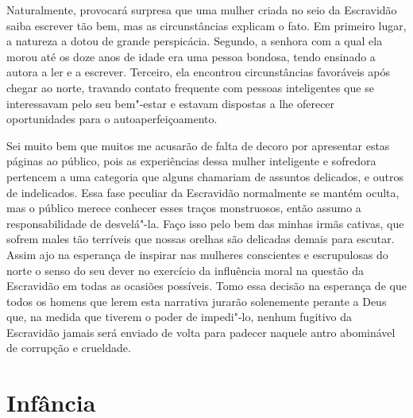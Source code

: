 Naturalmente, provocará surpresa que
uma mulher criada no seio da Escravidão saiba escrever tão bem, mas as
circunstâncias explicam o fato. Em primeiro lugar, a natureza a dotou de
grande perspicácia. Segundo, a senhora com a qual ela morou até os doze
anos de idade era uma pessoa bondosa, tendo ensinado a autora a ler e a
escrever. Terceiro, ela encontrou circunstâncias favoráveis após chegar
ao norte, travando contato frequente com pessoas inteligentes que se
interessavam pelo seu bem"-estar e estavam dispostas a lhe oferecer
oportunidades para o autoaperfeiçoamento.

Sei muito bem que muitos me acusarão de
falta de decoro por apresentar estas páginas ao público, pois as
experiências dessa mulher inteligente e sofredora pertencem a uma
categoria que alguns chamariam de assuntos delicados, e outros de
indelicados. Essa fase peculiar da Escravidão normalmente se mantém
oculta, mas o público merece conhecer esses traços monstruosos, então
assumo a responsabilidade de desvelá"-la. Faço isso pelo bem das minhas
irmãs cativas, que sofrem males tão terríveis que nossas orelhas são
delicadas demais para escutar. Assim ajo na esperança de inspirar nas
mulheres conscientes e escrupulosas do norte o senso do seu dever no
exercício da influência moral na questão da Escravidão em todas as
ocasiões possíveis. Tomo essa decisão na esperança de que todos os
homens que lerem esta narrativa jurarão solenemente perante a Deus que,
na medida que tiverem o poder de impedi"-lo,
nenhum fugitivo da Escravidão \enlargethispage{\textheight}
jamais será enviado de volta para padecer naquele antro abominável de
corrupção e crueldade.


\chapter*{Infância}

